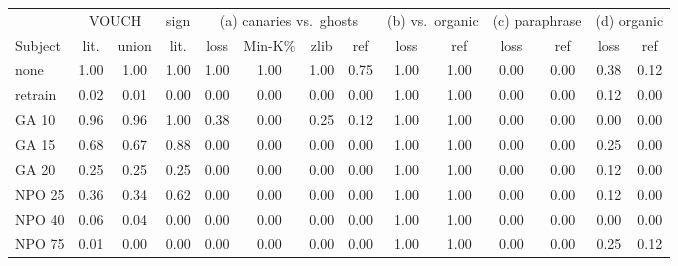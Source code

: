 \begin{tabular}{l ccc cccc cc cc cc}
\toprule
 & \multicolumn{2}{c}{VOUCH} & sign & \multicolumn{4}{c}{(a) canaries vs.\ ghosts} & \multicolumn{2}{c}{(b) vs.\ organic} & \multicolumn{2}{c}{(c) paraphrase} & \multicolumn{2}{c}{(d) organic} \\
\cmidrule(lr){2-3}\cmidrule(lr){4-4}\cmidrule(lr){5-8}\cmidrule(lr){9-10}\cmidrule(lr){11-12}\cmidrule(lr){13-14}
Subject & lit. & union & lit. & loss & Min-K\% & zlib & ref & loss & ref & loss & ref & loss & ref \\
\midrule
none & 1.00 & 1.00 & 1.00 & 1.00 & 1.00 & 1.00 & 0.75 & 1.00 & 1.00 & 0.00 & 0.00 & 0.38 & 0.12 \\
retrain & 0.02 & 0.01 & 0.00 & 0.00 & 0.00 & 0.00 & 0.00 & 1.00 & 1.00 & 0.00 & 0.00 & 0.12 & 0.00 \\
\midrule
GA 10 & 0.96 & 0.96 & 1.00 & 0.38 & 0.00 & 0.25 & 0.12 & 1.00 & 1.00 & 0.00 & 0.00 & 0.00 & 0.00 \\
GA 15 & 0.68 & 0.67 & 0.88 & 0.00 & 0.00 & 0.00 & 0.00 & 1.00 & 1.00 & 0.00 & 0.00 & 0.25 & 0.00 \\
GA 20 & 0.25 & 0.25 & 0.25 & 0.00 & 0.00 & 0.00 & 0.00 & 1.00 & 1.00 & 0.00 & 0.00 & 0.12 & 0.00 \\
NPO 25 & 0.36 & 0.34 & 0.62 & 0.00 & 0.00 & 0.00 & 0.00 & 1.00 & 1.00 & 0.00 & 0.00 & 0.12 & 0.00 \\
NPO 40 & 0.06 & 0.04 & 0.00 & 0.00 & 0.00 & 0.00 & 0.00 & 1.00 & 1.00 & 0.00 & 0.00 & 0.00 & 0.00 \\
NPO 75 & 0.01 & 0.00 & 0.00 & 0.00 & 0.00 & 0.00 & 0.00 & 1.00 & 1.00 & 0.00 & 0.00 & 0.25 & 0.12 \\
\bottomrule
\end{tabular}

